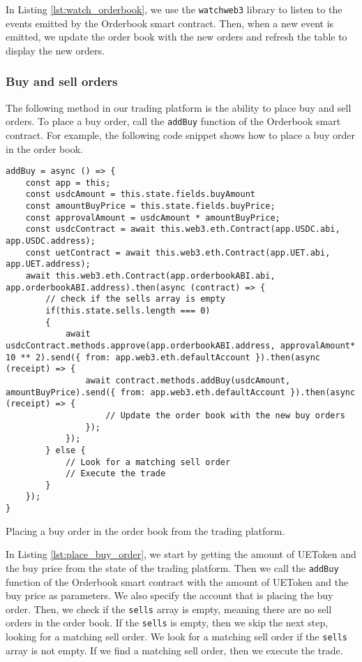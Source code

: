 In Listing \ref{lst:watch_orderbook}, we use the \texttt{watchweb3} library to listen to the events emitted by the Orderbook smart contract. Then, when a new event is
emitted, we update the order book with the new orders and refresh the table to display the new orders.


\subsubsection{Buy and sell orders}


The following method in our trading platform is the ability to place buy and sell orders. To place a buy order, call the \texttt{addBuy} function of the Orderbook
smart contract. For example, the following code snippet shows how to place a buy order in the order book.

\begin{listing}[H]
    \begin{verbatim}
addBuy = async () => {
    const app = this;
    const usdcAmount = this.state.fields.buyAmount
    const amountBuyPrice = this.state.fields.buyPrice;
    const approvalAmount = usdcAmount * amountBuyPrice;
    const usdcContract = await this.web3.eth.Contract(app.USDC.abi, app.USDC.address);
    const uetContract = await this.web3.eth.Contract(app.UET.abi, app.UET.address);
    await this.web3.eth.Contract(app.orderbookABI.abi, app.orderbookABI.address).then(async (contract) => {
        // check if the sells array is empty
        if(this.state.sells.length === 0)
        {
            await usdcContract.methods.approve(app.orderbookABI.address, approvalAmount* 10 ** 2).send({ from: app.web3.eth.defaultAccount }).then(async (receipt) => {
                await contract.methods.addBuy(usdcAmount, amountBuyPrice).send({ from: app.web3.eth.defaultAccount }).then(async (receipt) => {
                    // Update the order book with the new buy orders
                });
            });
        } else {
            // Look for a matching sell order
            // Execute the trade
        }
    });
}
    \end{verbatim}
    \caption{Placing a buy order in the order book from the trading platform.}
    \label{lst:place_buy_order}
\end{listing}

In Listing \ref{lst:place_buy_order}, we start by getting the amount of UEToken and the buy price from the state of the trading platform. Then we call the
\texttt{addBuy} function of the Orderbook smart contract with the amount of UEToken and the buy price as parameters. We also specify the account that is
placing the buy order. Then, we check if the \texttt{sells} array is empty, meaning there are no sell orders in the order book. If the \texttt{sells}
is empty, then we skip the next step, looking for a matching sell order. We look for a matching sell order if the \texttt{sells} array is not empty. If we find a matching sell order, then we execute the trade.


